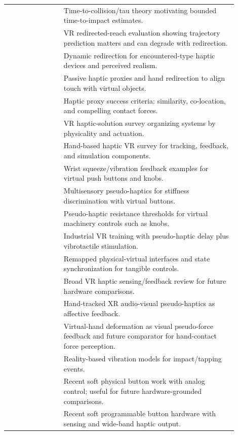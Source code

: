 \documentclass[11pt]{article}
\begin{document}
\begin{longtable}{p{0.22\linewidth}p{0.68\linewidth}}
\cite{lee1976tau} & Time-to-collision/tau theory motivating bounded time-to-impact estimates. \\
\cite{gonzalez2019minjerk} & VR redirected-reach evaluation showing trajectory prediction matters and can degrade with redirection. \\
\cite{gonzalez2020reachplus} & Dynamic redirection for encountered-type haptic devices and perceived realism. \\
\cite{cheng2017sparseproxy} & Passive haptic proxies and hand redirection to align touch with virtual objects. \\
\cite{nilsson2021hapticproxies} & Haptic proxy success criteria: similarity, co-location, and compelling contact forces. \\
\cite{bouzbib2021canitouch} & VR haptic-solution survey organizing systems by physicality and actuation. \\
\cite{tong2023handhaptics} & Hand-based haptic VR survey for tracking, feedback, and simulation components. \\
\cite{pezent2022tasbi} & Wrist squeeze/vibration feedback examples for virtual push buttons and knobs. \\
\cite{pezent2023multisensory} & Multisensory pseudo-haptics for stiffness discrimination with virtual buttons. \\
\cite{feick2023turnitup} & Pseudo-haptic resistance thresholds for virtual machinery controls such as knobs. \\
\cite{hwang2024industrial} & Industrial VR training with pseudo-haptic delay plus vibrotactile stimulation. \\
\cite{matthews2023remapped} & Remapped physical-virtual interfaces and state synchronization for tangible controls. \\
\cite{shi2024haptics} & Broad VR haptic sensing/feedback review for future hardware comparisons. \\
\cite{david2026feelings} & Hand-tracked XR audio-visual pseudo-haptics as affective feedback. \\
\cite{hotta2024handdeformation} & Virtual-hand deformation as visual pseudo-force feedback and future comparator for hand-contact force perception. \\
\cite{okamura2001vibration} & Reality-based vibration models for impact/tapping events. \\
\cite{raegrant2024dynabuttons} & Recent soft physical button work with analog control; useful for future hardware-grounded comparisons. \\
\cite{youn2025hapticoil} & Recent soft programmable button hardware with sensing and wide-band haptic output. \\
\bottomrule
\end{longtable}
\end{document}
